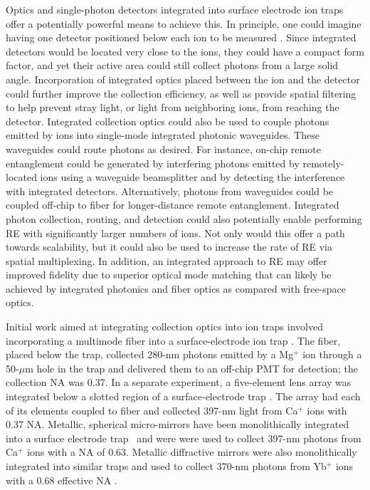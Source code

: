 \documentclass[%
reprint,
 amsmath,amssymb,
]{revtex4-1}
\begin{document}
Optics and single-photon detectors integrated into surface electrode ion traps offer a potentially powerful means to achieve this.  In principle, one could imagine having one detector positioned below each ion to be measured \cite{LekitscheMicrowaveBlueprint2017, MehtaThesis2017}. Since integrated detectors would be located very close to the ions, they could have a compact form factor, and yet their active area could still collect photons from a large solid angle.  Incorporation of integrated optics placed between the ion and the detector could further improve the collection efficiency, as well as provide spatial filtering to help prevent stray light, or light from neighboring ions, from reaching the detector.  Integrated collection optics could also be used to couple photons emitted by ions into single-mode integrated photonic waveguides. These waveguides could route photons as desired.  For instance, on-chip remote entanglement could be generated by interfering photons emitted by remotely-located ions using a waveguide beamsplitter and by detecting the interference with integrated detectors.  Alternatively, photons from waveguides could be coupled off-chip to fiber for longer-distance remote entanglement. Integrated photon collection, routing, and detection could also potentially enable performing RE with significantly larger numbers of ions.  Not only would this offer a path towards scalability, but it could also be used to increase the rate of RE via spatial multiplexing.  In addition, an integrated approach to RE may offer improved fidelity due to superior optical mode matching that can likely be achieved by integrated photonics and fiber optics as compared with free-space optics.

Initial work aimed at integrating collection optics into ion traps involved incorporating a multimode fiber into a surface-electrode ion trap \cite{VanDevenderFiberTrap2010}.  The fiber, placed below the trap, collected 280-nm photons emitted by a Mg$^+$ ion through a 50-$\mu$m hole in the trap and delivered them to an off-chip PMT for detection; the collection NA was 0.37.  In a separate experiment, a five-element lens array was integrated below a slotted region of a surface-electrode trap \cite{ClarkIntegrated5Collection2014}.  The array had each of its elements coupled to fiber and collected 397-nm light from Ca$^+$ ions with 0.37 NA.  Metallic, spherical micro-mirrors have been monolithically integrated into a surface electrode trap~\cite{merrill2011demonstration} and were were used to collect 397-nm photons from Ca$^+$ ions with a NA of 0.63.  Metallic diffractive mirrors were also monolithically integrated into similar traps and used to collect 370-nm photons from Yb$^+$ ions with a 0.68 effective NA \cite{Ghadimi2017}.
\end{document}
